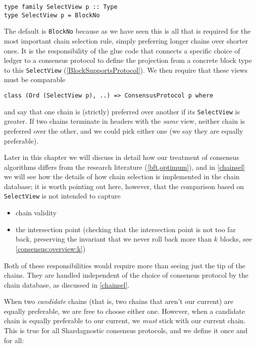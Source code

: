 \begin{lstlisting}
type family SelectView p :: Type
type SelectView p = BlockNo
\end{lstlisting}

The default is \lstinline!BlockNo! because as we have seen this is all that is
required for the most important chain selection rule, simply preferring longer
chains over shorter ones. It is the responsibility of the glue code that
connects a specific choice of ledger to a consensus protocol to define the
projection from a concrete block type to this \lstinline!SelectView!
(\ref{BlockSupportsProtocol}). We then require that these views must be
comparable
%
\begin{lstlisting}
class (Ord (SelectView p), ..) => ConsensusProtocol p where
\end{lstlisting}
%
and say that one chain is (strictly) preferred over another if its
\lstinline!SelectView! is greater. If two chains terminate in headers with
the \emph{same} view, neither chain is preferred over the other, and we
could pick either one (we say they are equally preferable).

Later in this chapter we will discuss in detail how our treatment of
consensus algorithms differs from the research literature (\cref{bft,optimum}),
and in \cref{chainsel} we will see how the details of how chain selection
is implemented in the chain database; it is worth pointing out here, however, that the comparison based on \lstinline!SelectView! is not intended to capture

\begin{itemize}
\item chain validity
\item the intersection point (checking that the intersection point is not too
far back, preserving the invariant that we never roll back more than $k$ blocks,
see \cref{consensus:overview:k})
\end{itemize}

Both of these responsibilities would require more than seeing just
the tip of the chains. They are handled independent of the choice of
consensus protocol by the chain database, as discussed in \cref{chainsel}.

When two \emph{candidate} chains (that is, two chains that aren't our current)
are equally preferable, we are free to choose either one. However, when a
candidate chain is equally preferable to our current, we \emph{must} stick
with our current chain. This is true for all Shardagnostic consensus protocols,
and we define it once and for all:

